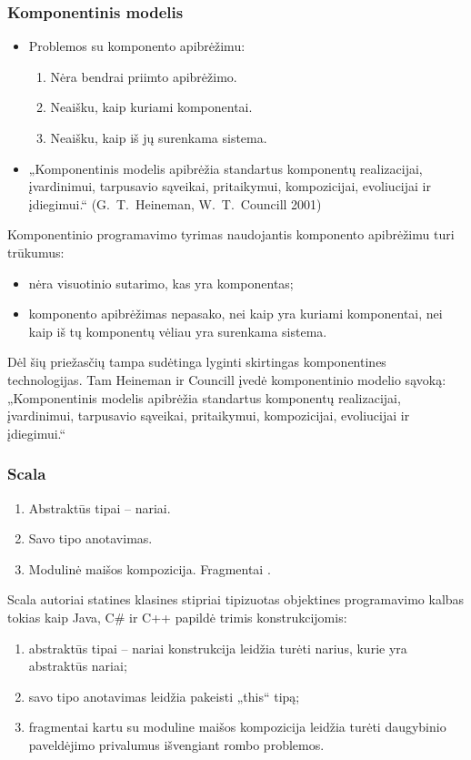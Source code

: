 \begin{frame}
  \frametitle{Komponentinis modelis}
  \begin{itemize}
    \item Problemos su komponento apibrėžimu:
      \begin{enumerate}
        \item Nėra bendrai priimto apibrėžimo.
        \item Neaišku, kaip kuriami komponentai.
        \item Neaišku, kaip iš jų surenkama sistema.
      \end{enumerate}
    \item „Komponentinis modelis apibrėžia standartus komponentų
      realizacijai, įvardinimui, tarpusavio sąveikai, pritaikymui,
      kompozicijai, evoliucijai ir įdiegimui.“ (\mbox{G. T. Heineman},
      \mbox{W. T. Councill} 2001)
  \end{itemize}
  \begin{handout}
    Komponentinio programavimo tyrimas naudojantis komponento apibrėžimu
    turi trūkumus:
    \begin{itemize}
      \item nėra visuotinio sutarimo, kas yra komponentas;
      \item komponento apibrėžimas nepasako, nei kaip yra kuriami
        komponentai, nei kaip iš tų komponentų vėliau yra surenkama
        sistema.
    \end{itemize}
    Dėl šių priežasčių tampa sudėtinga lyginti skirtingas
    komponentines technologijas. Tam Heineman ir Councill įvedė
    komponentinio modelio sąvoką:
    „Komponentinis modelis apibrėžia standartus komponentų
    realizacijai, įvardinimui, tarpusavio sąveikai, pritaikymui,
    kompozicijai, evoliucijai ir įdiegimui.“
  \end{handout}
\end{frame}

\begin{frame}
  \frametitle{Scala}
  \begin{enumerate}
    \item Abstraktūs tipai – nariai.
    \item Savo tipo anotavimas.
    \item Modulinė maišos kompozicija. Fragmentai .
  \end{enumerate}
  \begin{handout}
    Scala autoriai statines klasines stipriai tipizuotas objektines
    programavimo kalbas tokias kaip Java, C\# ir C++ papildė trimis
    konstrukcijomis:
    \begin{enumerate}
      \item abstraktūs tipai – nariai konstrukcija leidžia turėti
        narius, kurie yra abstraktūs nariai;
      \item savo tipo anotavimas leidžia pakeisti „this“ tipą;
      \item fragmentai kartu su moduline maišos kompozicija leidžia
        turėti daugybinio paveldėjimo privalumus išvengiant
        rombo problemos.
    \end{enumerate}
  \end{handout}
\end{frame}

